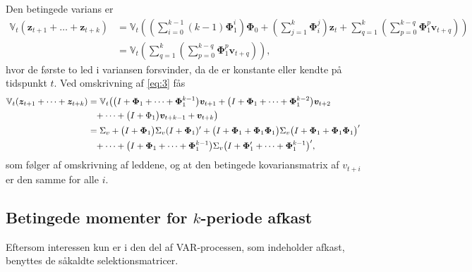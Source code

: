 \documentclass[
  a4paper,
  oneside]{memoir}
\begin{document}
\vspace{5mm}

Den betingede varians er
\begin{align}
        \mathbb{V}_t(\bm{z}_{t+1}+\dots+\bm{z}_{t+k})
        &=\mathbb{V}_t\left(\left(\sum_{i=0}^{k-1}(k-1)\bm{\Phi}_1^i\right)\bm{\Phi}_0+\left(\sum_{j=1}^k \bm{\Phi}_i^j\right)\bm{z}_t +\sum_{q=1}^k\left(\sum_{p=0}^{k-q}\bm{\Phi}_1^p \bm{v}_{t+q}\right)\right) \nonumber\\
        &=\mathbb{V}_t\left(\sum_{q=1}^k\left(\sum_{p=0}^{k-q} \bm{\Phi}_1^p \bm{v}_{t+q}\right)\right) \label{eq:3},
    \end{align}
hvor de første to led i variansen forsvinder, da de er konstante eller kendte på tidspunkt \(t\). Ved omskrivning af \eqref{eq:3} fås
\begin{align*}
        \mathbb{V}_t(\bm{z}_{t+1}+\dots+\bm{z}_{t+k})&=\mathbb{V}_t\big(\big(I+\bm{\Phi}_1+\dots+\bm{\Phi}_1^{k-1}\big)\bm{v}_{t+1}+\big(I+\bm{\Phi}_1+\dots+\bm{\Phi}_1^{k-2}\big)\bm{v}_{t+2}\\
        &\hphantom{=}+\dots+\big(I+\Phi_1\big)\bm{v}_{t+k-1}+\bm{v}_{t+k}\big)\\
        &=\Sigma_v+\big(I+\bm{\Phi}_1\big)\Sigma_v(I+\bm{\Phi}_1)'+\big(I+\bm{\Phi}_1+\bm{\Phi}_1\bm{\Phi}_1\big)\Sigma_v\big(I+\bm{\Phi}_1+\bm{\Phi}_1\bm{\Phi}_1\big)'\\
        &\hphantom{=}+\dots+\big(I+\bm{\Phi}_1+\dots+\bm{\Phi}_1^{k-1}\big)\Sigma_v\big(I+\bm{\Phi}_1'+\dots+\bm{\Phi}_1^{k-1}\big)',
    \end{align*}
som følger af omskrivning af leddene, og at den betingede kovariansmatrix af \(v_{t+i}\) er den samme for alle \(i\).

\subsection{Betingede momenter for $k$-periode afkast}

Eftersom interessen kun er i den del af VAR-processen, som indeholder afkast, benyttes de såkaldte selektionsmatricer.
\end{document}
